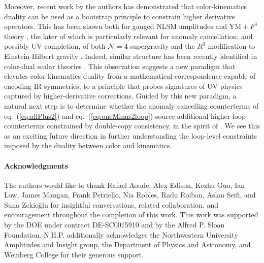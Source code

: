 \documentclass[12pt,letter]{article}
\def\eqn#1{eq.~(\ref{#1})}
\begin{document}
Moreover, recent work by the authors has demonstrated that color-kinematics duality can be used as a bootstrap principle to constrain higher derivative operators. This has been shown both for gauged NLSM amplitudes \cite{Carrasco:2022sck} and $\text{YM}+F^3$ theory \cite{Carrasco:2022lbm}, the later of which is particularly relevant for anomaly cancellation, and possibly UV completion, of both $\mathcal{N}=4$ supergravity and the $R^3$ modification to Einstein-Hilbert gravity \cite{Carrasco:2022lbm}. Indeed, similar structure has been recently identified in color-dual scalar theories \cite{Chen:2022shl,Chen:2023dcx,Brown:2023srz}. This observation suggests a new paradigm that elevates color-kinematics duality from a mathematical correspondence capable of encoding IR symmetries, to a principle that probes signatures of UV physics captured by higher-derivative corrections. Guided by this new paradigm, a natural next step is to determine whether the anomaly cancelling counterterms of \eqn{eq:allPlus2} and \eqn{eq:oneMinus2loop} source additional higher-loop counterterms constrained by double-copy consistency, in the spirit of \cite{Carrasco:2022lbm}. We see this as an exciting future direction in further understanding the loop-level constraints imposed by the duality between color and kinematics.  


\paragraph{Acknowledgments} The authors would like to thank Rafael Aoude, Alex Edison, Kezhu Guo, Ian Low, James Mangan, Frank Petriello, Nia Robles, Radu Roiban, Aslan Seifi, and Suna Zekio\u{g}lu for insightful conversations, related collaboration, and encouragement throughout the completion of this work. This work was supported by the DOE under contract DE-SC0015910 and by the Alfred P. Sloan Foundation. N.H.P. additionally acknowledges the Northwestern University Amplitudes and Insight group, the Department of Physics and Astronomy, and Weinberg College for their generous support. 



\end{document}
